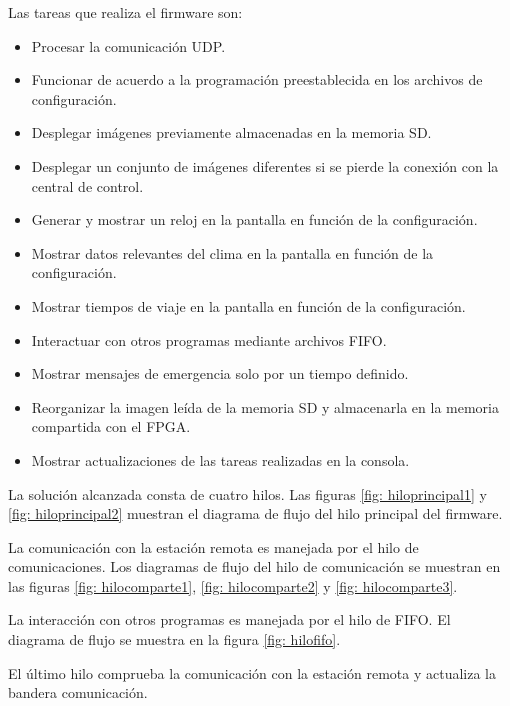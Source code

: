Las tareas que realiza el firmware son:
\begin{itemize}
\item Procesar la comunicación UDP.
\item Funcionar de acuerdo a la programación preestablecida en los archivos de configuración.
\item Desplegar imágenes previamente almacenadas en la memoria SD.  
\item Desplegar un conjunto de imágenes diferentes si se pierde la conexión con la central de control.
\item Generar y mostrar un reloj en la pantalla en función de la configuración.
\item Mostrar datos relevantes del clima en la pantalla en función de la configuración.
\item Mostrar tiempos de viaje en la pantalla en función de la configuración.
\item Interactuar con otros programas mediante archivos FIFO.
\item Mostrar mensajes de emergencia solo por un tiempo definido.
\item Reorganizar la imagen leída de la memoria SD y almacenarla en la memoria compartida con el FPGA.
\item Mostrar actualizaciones de las tareas realizadas en la consola.
\end{itemize}

La solución alcanzada consta de cuatro hilos. Las figuras \ref{fig: hiloprincipal1} y \ref{fig: hiloprincipal2} muestran el diagrama de flujo del hilo principal del firmware. 

La comunicación con la estación remota es manejada por el hilo de comunicaciones. Los diagramas de flujo del hilo de comunicación se muestran en las figuras \ref{fig: hilocomparte1}, \ref{fig: hilocomparte2} y \ref{fig: hilocomparte3}.

La interacción con otros programas es manejada por el hilo de FIFO. El diagrama de flujo se muestra en la figura \ref{fig: hilofifo}.

El último hilo comprueba la comunicación con la estación remota y actualiza la bandera comunicación.

